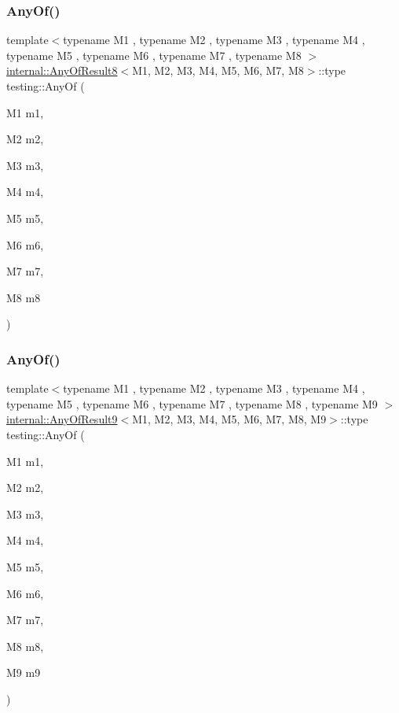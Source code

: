 \mbox{\label{namespacetesting_a9c979c62cc004664b14e0ce444e531d5}} 
\subsubsection{\texorpdfstring{Any\+Of()}{AnyOf()}\hspace{0.1cm}{\footnotesize\ttfamily [7/9]}}
{\footnotesize\ttfamily template$<$typename M1 , typename M2 , typename M3 , typename M4 , typename M5 , typename M6 , typename M7 , typename M8 $>$ \\
\hyperlink{structtesting_1_1internal_1_1_any_of_result8}{internal\+::\+Any\+Of\+Result8}$<$M1, M2, M3, M4, M5, M6, M7, M8$>$\+::type testing\+::\+Any\+Of (\begin{DoxyParamCaption}\item[{M1}]{m1,  }\item[{M2}]{m2,  }\item[{M3}]{m3,  }\item[{M4}]{m4,  }\item[{M5}]{m5,  }\item[{M6}]{m6,  }\item[{M7}]{m7,  }\item[{M8}]{m8 }\end{DoxyParamCaption})\hspace{0.3cm}{\ttfamily [inline]}}

\mbox{\label{namespacetesting_a873c812db953aebd4bf2ffbff0e8d770}} 
\subsubsection{\texorpdfstring{Any\+Of()}{AnyOf()}\hspace{0.1cm}{\footnotesize\ttfamily [8/9]}}
{\footnotesize\ttfamily template$<$typename M1 , typename M2 , typename M3 , typename M4 , typename M5 , typename M6 , typename M7 , typename M8 , typename M9 $>$ \\
\hyperlink{structtesting_1_1internal_1_1_any_of_result9}{internal\+::\+Any\+Of\+Result9}$<$M1, M2, M3, M4, M5, M6, M7, M8, M9$>$\+::type testing\+::\+Any\+Of (\begin{DoxyParamCaption}\item[{M1}]{m1,  }\item[{M2}]{m2,  }\item[{M3}]{m3,  }\item[{M4}]{m4,  }\item[{M5}]{m5,  }\item[{M6}]{m6,  }\item[{M7}]{m7,  }\item[{M8}]{m8,  }\item[{M9}]{m9 }\end{DoxyParamCaption})\hspace{0.3cm}{\ttfamily [inline]}}

